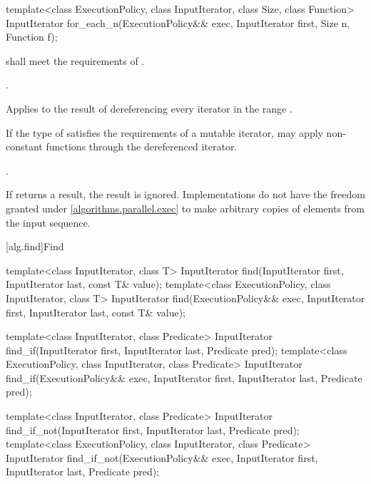 %
\begin{itemdecl}
template<class ExecutionPolicy, class InputIterator, class Size, class Function>
  InputIterator for_each_n(ExecutionPolicy&& exec, InputIterator first, Size n,
                           Function f);
\end{itemdecl}

\begin{itemdescr}
\pnum
\requires
{} shall meet the requirements of .

\pnum
\requires
{}.

\pnum
\effects
Applies  to the result of dereferencing every iterator in the range
.
\begin{note}
If the type of  satisfies the requirements of a mutable iterator,
 may apply non-constant functions through the dereferenced iterator.
\end{note}

\pnum
\returns
{}.

\pnum
\remarks
If  returns a result, the result is ignored.  Implementations do not
have the freedom granted under \ref{algorithms.parallel.exec} to make arbitrary
copies of elements from the input sequence.
\end{itemdescr}


[alg.find]{Find}

%
%
%
\begin{itemdecl}
template<class InputIterator, class T>
  InputIterator find(InputIterator first, InputIterator last,
                     const T& value);
template<class ExecutionPolicy, class InputIterator, class T>
  InputIterator find(ExecutionPolicy&& exec, InputIterator first, InputIterator last,
                     const T& value);

template<class InputIterator, class Predicate>
  InputIterator find_if(InputIterator first, InputIterator last,
                        Predicate pred);
template<class ExecutionPolicy, class InputIterator, class Predicate>
  InputIterator find_if(ExecutionPolicy&& exec, InputIterator first, InputIterator last,
                        Predicate pred);

template<class InputIterator, class Predicate>
  InputIterator find_if_not(InputIterator first, InputIterator last,
                            Predicate pred);
template<class ExecutionPolicy, class InputIterator, class Predicate>
  InputIterator find_if_not(ExecutionPolicy&& exec, InputIterator first, InputIterator last,
                            Predicate pred);
\end{itemdecl}

